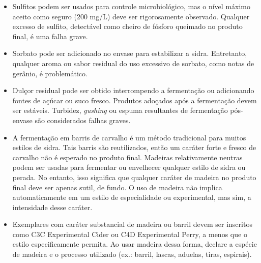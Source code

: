 \begin{itemize}
\item Sulfitos podem ser usados para controle microbiológico, mas o nível máximo aceito como seguro (200 mg/L) deve ser rigorosamente observado. Qualquer excesso de sulfito, detectável como cheiro de fósforo queimado no produto final, é uma falha grave.
\item Sorbato pode ser adicionado no envase para estabilizar a sidra. Entretanto, qualquer aroma ou sabor residual do uso excessivo de sorbato, como notas de gerânio, é problemático.
\item Dulçor residual pode ser obtido interrompendo a fermentação ou adicionando fontes de açúcar ou suco fresco. Produtos adoçados após a fermentação devem ser estáveis. Turbidez, \textit{gushing} ou espuma resultantes de fermentação pós-envase são considerados falhas graves.
\item A fermentação em barris de carvalho é um método tradicional para muitos estilos de sidra. Tais barris são reutilizados, então um caráter forte e fresco de carvalho não é esperado no produto final. Madeiras relativamente neutras podem ser usadas para fermentar ou envelhecer qualquer estilo de sidra ou perada. No entanto, isso significa que qualquer caráter de madeira no produto final deve ser apenas sutil, de fundo. O uso de madeira não implica automaticamente em um estilo de especialidade ou experimental, mas sim, a intensidade desse caráter.
\item Exemplares com caráter substancial de madeira ou barril devem ser inscritos como C3C Experimental Cider ou C4D Experimental Perry, a menos que o estilo especificamente permita. Ao usar madeira dessa forma, declare a espécie de madeira e o processo utilizado (ex.: barril, lascas, aduelas, tiras, espirais).
\end{itemize}
